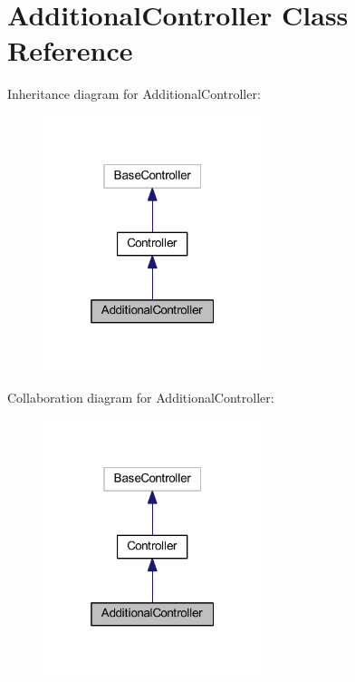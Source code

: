 \hypertarget{class_app_1_1_http_1_1_controllers_1_1_product_1_1_additional_controller}{}\section{Additional\+Controller Class Reference}
\label{class_app_1_1_http_1_1_controllers_1_1_product_1_1_additional_controller}


Inheritance diagram for Additional\+Controller\+:
\nopagebreak
\begin{figure}[H]
\begin{center}
\leavevmode
\includegraphics[width=181pt]{class_app_1_1_http_1_1_controllers_1_1_product_1_1_additional_controller__inherit__graph}
\end{center}
\end{figure}


Collaboration diagram for Additional\+Controller\+:
\nopagebreak
\begin{figure}[H]
\begin{center}
\leavevmode
\includegraphics[width=181pt]{class_app_1_1_http_1_1_controllers_1_1_product_1_1_additional_controller__coll__graph}
\end{center}
\end{figure}
